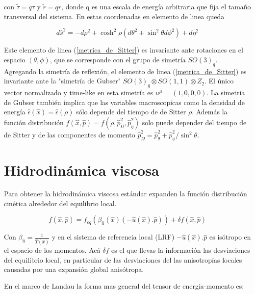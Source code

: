 \documentclass[11pt,a4paper]{article}
\begin{document}
con $\tilde{\tau}=q\tau$ y $\tilde{r}=qr$, donde q es una escala de energía arbitraria que fija el tamaño transversal del sistema. En estas coordenadas en elemento de linea queda



\begin{equation}
d\hat{s}^2=-d{\rho}^2+\cosh^2{\rho}(d{\theta}^2+\sin^2{\theta}d{\phi}^2)+d{\eta}^2
\label{metrica_de_Sitter}
\end{equation}

Este elemento de linea (\ref{metrica_de_Sitter}) es invariante ante rotaciones en el espacio $(\theta,\phi)$, que se corresponde con el grupo de simetría $SO(3)_q$. Agregando la simetría de reflexión, el elemento de linea (\ref{metrica_de_Sitter}) es invariante ante la "simetría de Gubser" $SO(3)_{q}{\otimes}SO(1,1){\otimes}Z_{2}$. El único vector normalizado y time-like en esta simetría es $u^{\mu}=(1,0,0,0)$.
La simetría de Gubser también implica que las variables macroscopicas como la densidad de energía $\hat{\epsilon}(\hat{x})=\hat{\epsilon}(\rho)$ sólo depende del tiempo de de Sitter $\rho$. Además la función distribución $f( \hat{x}, \hat{p})=f( \rho, \hat{p}^2_{\Omega},\hat{p}^2_{\eta})$ solo puede depender del tiempo de de Sitter y de las componentes de momento $\hat{p}^2_{\Omega}=\hat{p}^2_{\theta}+\hat{p}^2_{\phi}/\sin^2\theta$.




\section{Hidrodinámica viscosa}

Para obtener la hidrodinámica viscosa estándar expanden la función distribución cinética alrededor del equilibrio local.

\begin{equation}
f( \hat{x}, \hat{p})= f_{eq}(\beta_{\hat{u}}(\hat{x})(-\hat{u}(\hat{x}).\hat{p}))+{\delta}f( \hat{x}, \hat{p})
\label{expansion}
\end{equation}

Con $\beta_{\hat{u}}=\frac{1}{\hat{T}(\hat{x})}$ y en el sistema de referencia local (LRF) $-\hat{u}(\hat{x}).\hat{p}$ es isótropo en el espacio de los momentos. Acá ${\delta}f$ es el que llevas la información las desviaciones del equilibrio local, en particular de las desviaciones del las anisotropías locales causadas por una expansión global anisótropa.



En el marco de Landau la forma mas general del tensor de energía-momento es:
\end{document}
